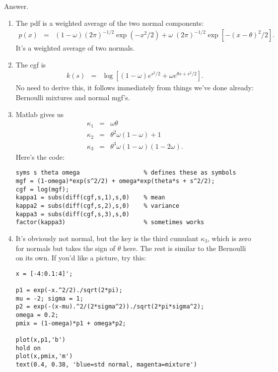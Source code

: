 \documentclass[11pt]{article}
\begin{document}
\begin{enumerate}
Answer.
\begin{enumerate}
\item The pdf is a weighted average of the two normal components:
\begin{eqnarray*}
        p(x) &=& (1-\omega) (2 \pi)^{-1/2} \exp(-x^2/2) +
            \omega \; (2 \pi)^{-1/2} \exp[-(x-\theta)^2/2 ].
\end{eqnarray*}
It's a weighted average of two normals.
\item The cgf is
\begin{eqnarray*}
    k(s) &=&  \log \left[ (1-\omega) e^{s^2/2}
                + \omega  e^{\theta s + s^2/2} \right].
\end{eqnarray*}
No need to derive this, it follows immediately from things we've done already:
Bernoulli mixtures and normal mgf's.
\item Matlab gives us
\begin{eqnarray*}
    \kappa_1 &=& \omega \theta \\
    \kappa_2 &=& \theta^2 \omega (1-\omega) + 1 \\
    \kappa_3 &=& \theta^3 \omega (1-\omega) (1-2\omega) .
\end{eqnarray*}
Here's the code:
\begin{verbatim}
syms s theta omega                  % defines these as symbols
mgf = (1-omega)*exp(s^2/2) + omega*exp(theta*s + s^2/2);
cgf = log(mgf);
kappa1 = subs(diff(cgf,s,1),s,0)    % mean
kappa2 = subs(diff(cgf,s,2),s,0)    % variance
kappa3 = subs(diff(cgf,s,3),s,0)
factor(kappa3)                      % sometimes works
\end{verbatim}
\item It's obviously not normal, but the key is the third cumulant $\kappa_3$,
which is zero for normals
but takes the sign of $\theta$ here.
The rest is similar to the Bernoulli on its own.
If you'd like a picture, try this:
\begin{verbatim}
x = [-4:0.1:4]';

p1 = exp(-x.^2/2)./sqrt(2*pi);
mu = -2; sigma = 1;
p2 = exp(-(x-mu).^2/(2*sigma^2))./sqrt(2*pi*sigma^2);
omega = 0.2;
pmix = (1-omega)*p1 + omega*p2;

plot(x,p1,'b')
hold on
plot(x,pmix,'m')
text(0.4, 0.38, 'blue=std normal, magenta=mixture')
\end{verbatim}
\end{enumerate}



\end{enumerate}
\end{document}
